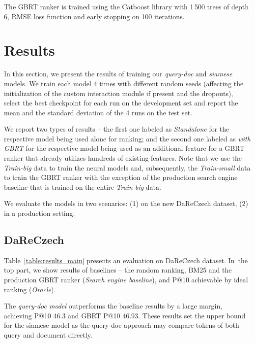 \documentclass[letterpaper]{article} \usepackage{aaai22 }  \usepackage{times}  \usepackage{helvet}  \usepackage{courier}  \usepackage[hyphens]{url}  \usepackage{graphicx} \usepackage{amsmath,amsfonts,amssymb, mathabx,bm,bbm}
\begin{document}
The GBRT ranker is trained using the Catboost library with 1\,500 trees of depth 6, RMSE loss function and early stopping on 100 iterations.

\section{Results}\label{sec:results}

In this section, we present the results of training our \emph{query-doc} and \emph{siamese} models. We train each model 4 times with different random seeds (affecting the initialization of the custom interaction module if present and the dropouts), select the best checkpoint for each run on the development set and report the mean and the standard deviation of the 4 runs on the test set.

We report two types of results – the first one labeled as \textit{Standalone} for the respective model being used alone for ranking; and the second one labeled as \textit{with GBRT} for the respective model being used as an additional feature for a GBRT ranker that already utilizes hundreds of existing features. Note that we use the \textit{Train-big} data to train the neural models and, subsequently, the \textit{Train-small} data to train the GBRT ranker with the exception of the production search engine baseline that is trained on the entire \textit{Train-big} data.

We evaluate the models in two scenarios: (1) on the new DaReCzech dataset, (2) in a production setting.

\subsection{DaReCzech}

Table~\ref{table:results_main} presents an evaluation on DaReCzech dataset. In~the top part, we show results of baselines – the random ranking, BM25 and the production GBRT ranker (\textit{Search engine baseline}), and P@10 achievable by ideal ranking (\textit{Oracle}).

The \textit{query-doc model} outperforms the baseline results by a large margin, achieving P@10 46.3 and GBRT P@10 46.93. 
These results set the upper bound for the siamese model as the query-doc approach may compare tokens of both query and document directly.
\end{document}

